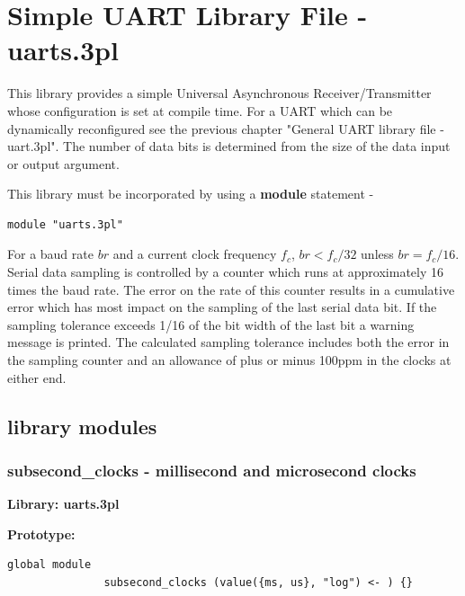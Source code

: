 \pagebreak

\section{Simple UART Library File - uarts.3pl}

    This library provides a simple Universal Asynchronous Receiver/Transmitter
    whose configuration is set at compile time. For a UART which can be
    dynamically reconfigured see the previous chapter "General UART library
    file - uart.3pl". The number of data bits is determined from the size
    of the data input or output argument.
    
    This library must be incorporated by using a {\bf module} statement -
    \begin{lstlisting}[gobble=4, language=threepl]
       module "uarts.3pl"
    \end{lstlisting}
    
    For a baud rate $br$ and a current clock frequency $f_c$,
    $br < f_c / 32$ unless $br = f_c / 16$.
    Serial data sampling is controlled by a counter which runs at approximately
    16 times the baud rate. The error on the rate of this counter results
    in a cumulative error which has most impact on the sampling of the
    last serial data bit. If the sampling tolerance exceeds 1/16 of the bit
    width of the last bit a warning message is printed. The calculated sampling tolerance
    includes both the error in the sampling counter and an allowance of
    plus or minus 100ppm in the clocks at either end.


    \subsection{library modules}



        \subsubsection{subsecond\_clocks - millisecond and microsecond
                                    clocks}\label{sec:lmssubsecondclocks}

            {\bf Library: uarts.3pl}

            {\bf Prototype:} \\
            \vsp
            \begin{lstlisting}[gobble=12, language=threepl]
               global module
               subsecond_clocks (value({ms, us}, "log") <- ) {}
            \end{lstlisting}

